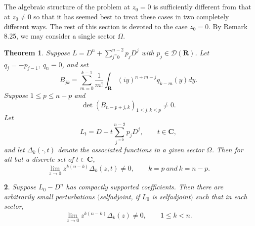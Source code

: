 \documentclass{surv-l}
\theoremstyle{plain}
\newtheorem{theorem}{Theorem}[section]
\newtheorem{cor}[theorem]{\sc{Corollary}}
\theoremstyle{definition}
\numberwithin{equation}{chapter}
\begin{document}
\subsection{}\label{subsec18.6}  The algebraic structure of the problem at $z_{0}=0$ is sufficiently different from that at $z_{0}\neq 0$  so  that it has seemed best to treat these cases in two completely different ways. The rest of this section is devoted to the case $z_{0}=0$. By Remark 8.25, we may consider a single sector $\Omega$.
\setcounter{theorem}{6}
\begin{theorem}\label{thm18.7}  Suppose $L=D^{n}+\sum_{j^=0}^{n-2}p_{j}D^{j}$  with $p_{j}\in \mathscr{D}(\mathbf{R})$. Let $q_{j}=-p_{j-1},\ q_{n}\equiv 0$, and set
\setcounter{equation}{7}
\begin{equation}\label{eq18.8}
B_{jk}=\sum_{m=0}^{k-1}\frac{1}{m!}\int_{\mathbf{R}}(iy)^{n+m-j}q_{k-m}(y)dy.
\end{equation}
Suppose $1\leq p\leq n-p$ and
\begin{equation}\label{eq18.9}
\det(B_{n-p+j,k})_{1\leq j,k\leq p}\neq 0.
\end{equation}
Let
\begin{equation}\label{eq18.10}
L_{t}=D+t\sum_{j^{=0}}^{n-2}p_{j}D^{j},\qquad t\in \mathbf{C},
\end{equation}
and let $\Delta_{k}(\cdot, t)$ denote the associated functions in a given sector $\Omega$. Then for all but a discrete set of $t\in \mathbf{C}$,
\begin{equation}\label{eq18.11}
\lim_{z\rightarrow 0}z^{k(n-k)}\Delta_{k}(z, t)\neq 0,\qquad  k=p\ and\ k=n-p.
\end{equation}
\end{theorem}
\setcounter{theorem}{11}
\begin{cor}\label{coro18.12}
Suppose $L_{0}-D^{n}$ has compactly supported coefficients. Then there are arbitrarily small perturbations $($selfadjoint, if $L_{0}$ is selfadjoint$)$ such that in each sector,
\setcounter{equation}{12}
\begin{equation}\label{eq18.13}
\lim_{z\rightarrow 0}z^{k(n-k)}\Delta_{k}(z)\neq 0,\qquad 1\leq k<n.
\end{equation}
\end{cor}
\end{document}

